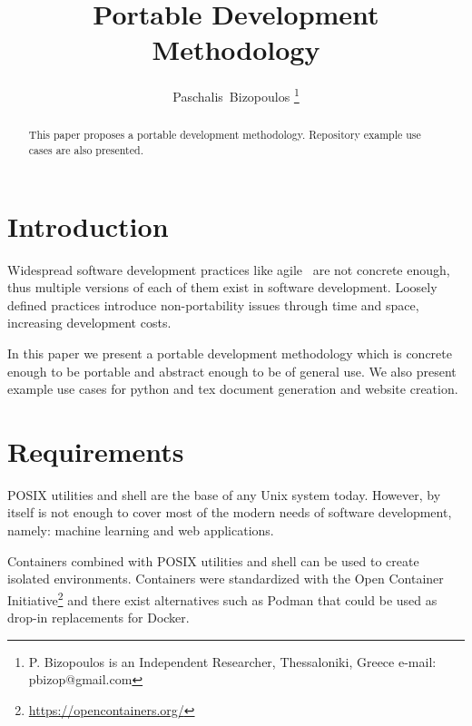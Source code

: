 \documentclass[journal]{IEEEtran}
\begin{document}
\title{Portable Development Methodology}

\author{Paschalis~Bizopoulos
\thanks{P. Bizopoulos is an Independent Researcher, Thessaloniki, Greece e-mail: pbizop@gmail.com}}

\maketitle

\begin{abstract}
	This paper proposes a portable development methodology.
	Repository example use cases are also presented.
\end{abstract}

\section{Introduction}
Widespread software development practices like agile~\cite{abrahamsson2017agile} are not concrete enough, thus multiple versions of each of them exist in software development.
Loosely defined practices introduce non-portability issues through time and space, increasing development costs.

In this paper we present a portable development methodology which is concrete enough to be portable and abstract enough to be of general use.
We also present example use cases for python and tex document generation and website creation.

\section{Requirements}
POSIX utilities and shell are the base of any Unix system today.
However, by itself is not enough to cover most of the modern needs of software development, namely: machine learning and web applications.

Containers combined with POSIX utilities and shell can be used to create isolated environments.
Containers were standardized with the Open Container Initiative\footnote{\url{https://opencontainers.org/}} and there exist alternatives such as Podman that could be used as drop-in replacements for Docker.
\end{document}
